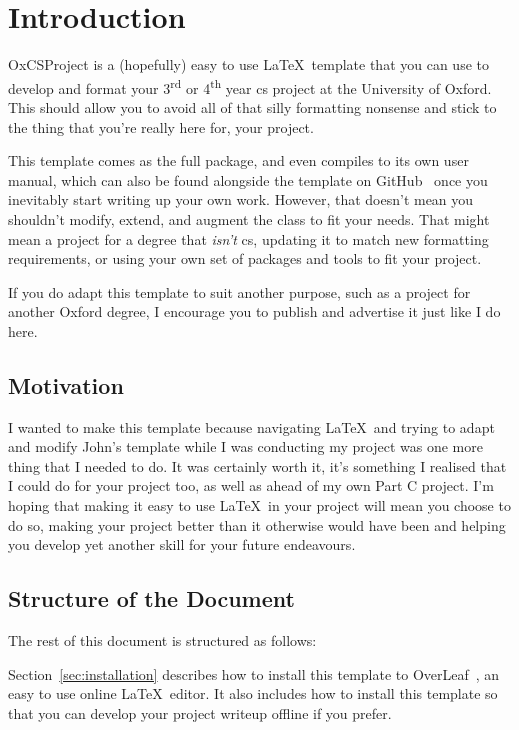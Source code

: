 \section{Introduction}
\label{sec:introduction}

OxCSProject is a (hopefully) easy to use \LaTeX\ template that you can use to develop and format
your 3\textsuperscript{rd} or 4\textsuperscript{th} year \acrfull{cs} project at the University of
Oxford. This should allow you to avoid all of that silly formatting nonsense and stick to the
thing that you're really here for, your project.

This template comes as the full package, and even compiles to its own user manual, which can also
be found alongside the template on GitHub~\cite{stevensonNedStevensonOxCSProject2024} once you
inevitably start writing up your own work. However, that doesn't mean you shouldn't modify,
extend, and augment the class to fit your needs. That might mean a project for a degree that
\textit{isn't} \acrlong{cs}, updating it to match new formatting requirements, or using your own
set of packages and tools to fit your project.

If you do adapt this template to suit another purpose, such as a project for another Oxford
degree, I encourage you to publish and advertise it just like I do here.

\subsection{Motivation}

I wanted to make this template because navigating \LaTeX\ and trying to adapt and modify John's
template while I was conducting my project was one more thing that I needed to do. It was
certainly worth it, it's something I realised that I could do for your project too, as well as
ahead of my own Part C project. I'm hoping that making it easy to use \LaTeX\ in your project will
mean you choose to do so, making your project better than it otherwise would have been and helping
you develop yet another skill for your future endeavours.

\subsection{Structure of the Document}
The rest of this document is structured as follows:

Section~\ref{sec:installation} describes how to install this template to
OverLeaf~\cite{OverleafOnlineLaTeX}, an easy to use online \LaTeX\ editor. It also includes how to
install this template so that you can develop your project writeup offline if you prefer.

